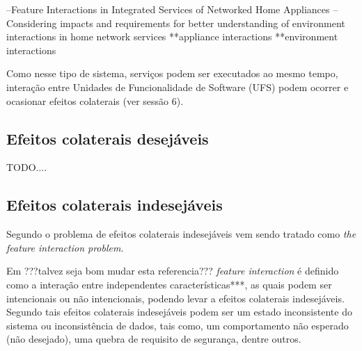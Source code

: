 --Feature Interactions in Integrated Services of Networked Home Appliances
--Considering impacts and requirements for better understanding of environment interactions in home network services
**appliance interactions
**environment interactions


Como nesse tipo de sistema, serviços podem ser executados ao mesmo tempo, interação entre Unidades de Funcionalidade de Software (UFS) podem ocorrer e ocasionar efeitos colaterais (ver sessão 6).\cite{Ikegami:2013}
\subsection{Efeitos colaterais desejáveis}
TODO....
\subsection{Efeitos colaterais indesejáveis}
Segundo \cite{Weiss:2007}o problema de efeitos colaterais indesejáveis vem sendo tratado como \textit{the feature interaction problem}.

Em \cite{Weiss}???talvez seja bom mudar esta referencia??? \textit{feature interaction} é definido como a interação entre independentes características***, as quais podem ser intencionais ou não intencionais, podendo levar a efeitos colaterais indesejáveis. Segundo \cite{Weiss:2007 } tais efeitos colaterais indesejáveis podem ser um estado inconsistente do sistema ou inconsistência de dados, tais como, um comportamento não esperado (não desejado), uma quebra de requisito de segurança, dentre outros.

